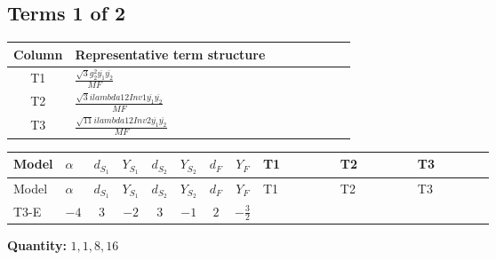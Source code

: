 \documentclass[8pt]{article}
\begin{document}
\begin{landscape}
\subsection*{Terms 1 of 2}
\begin{center}
\begin{tabular}{@{}c >{\raggedright\arraybackslash}p{0.82\linewidth}@{}}
\toprule
Column & Representative term structure \\
\midrule
T1 & \(\displaystyle \frac{\sqrt{3} g_{2}^{2} \overline{y_{1}} \overline{y_{2}}}{MF}\) \\
\midrule
T2 & \(\displaystyle \frac{\sqrt{3} i lambda12Inv1 \overline{y_{1}} \overline{y_{2}}}{MF}\) \\
\midrule
T3 & \(\displaystyle \frac{\sqrt{11} i lambda12Inv2 \overline{y_{1}} \overline{y_{2}}}{MF}\) \\
\midrule
\bottomrule
\end{tabular}
\end{center}
\smallskip
\tiny
\begin{longtable}{@{}llcccccc >{\raggedright\arraybackslash}p{0.21\linewidth} >{\raggedright\arraybackslash}p{0.21\linewidth} >{\raggedright\arraybackslash}p{0.21\linewidth}@{}}
\toprule
Model & $\alpha$ & $d_{S_1}$ & $Y_{S_1}$ & $d_{S_2}$ & $Y_{S_2}$ & $d_F$ & $Y_F$ & T1 & T2 & T3 \\
\midrule
\endfirsthead
\toprule
Model & $\alpha$ & $d_{S_1}$ & $Y_{S_1}$ & $d_{S_2}$ & $Y_{S_2}$ & $d_F$ & $Y_F$ & T1 & T2 & T3 \\
\midrule
\endhead
T3-E & $-4$ & $3$ & $-2$ & $3$ & $-1$ & $2$ & $-\frac{3}{2}$ & \scriptsize\adjustbox{max width=\linewidth}{$\begin{gathered} \frac{\sqrt{3} g_{2}^{2} \overline{y_{1}} \overline{y_{2}}}{6 MF}\end{gathered}$} & \scriptsize\adjustbox{max width=\linewidth}{$\begin{gathered} - \frac{\sqrt{3} i lambda12Inv1 \overline{y_{1}} \overline{y_{2}}}{6 MF}\end{gathered}$} & \scriptsize\adjustbox{max width=\linewidth}{$\begin{gathered} \frac{3 \sqrt{11} i lambda12Inv2 \overline{y_{1}} \overline{y_{2}}}{22 MF}\end{gathered}$} \\
\midrule
\bottomrule
\end{longtable}
\clearpage
\noindent\textbf{Quantity: }$\mathrm{1,1,8,16}$\par\smallskip

\end{landscape}
\end{document}
